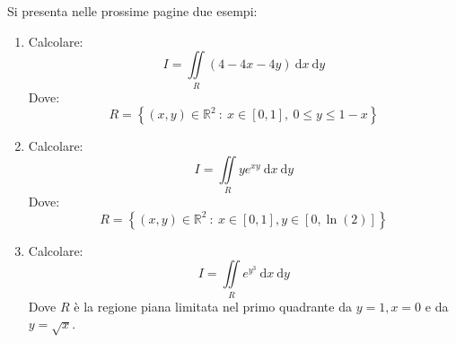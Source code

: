 \documentclass[a4paper]{article}
\begin{document}
	\noindent
	Si presenta nelle prossime pagine due esempi:
	\begin{enumerate}
		\item Calcolare:
		\begin{equation*}
			I = \iint \limits_{R} \left(4 - 4x - 4y\right) \:\mathrm{d}x \:\mathrm{d}y
		\end{equation*}
		Dove:
		\begin{equation*}
			R = \left\{\left(x,y\right) \in \mathbb{R}^{2} \: : \: x \in \left[0,1\right], \: 0 \le y \le 1-x\right\}
		\end{equation*}

		\item Calcolare:
		\begin{equation*}
			I = \iint \limits_{R} ye^{xy} \: \mathrm{d}x \: \mathrm{d}y
		\end{equation*}
		Dove:
		\begin{equation*}
			R = \left\{\left(x,y\right) \in \mathbb{R}^{2} \: : \: x \in \left[0,1\right], y\in\left[0,\ln\left(2\right)\right]\right\}
		\end{equation*}

		\item Calcolare:
		\begin{equation*}
			I = \iint \limits_{R} e^{y^{3}} \:\mathrm{d}x \:\mathrm{d}y
		\end{equation*}
		Dove $R$ è la regione piana limitata nel primo quadrante da $y = 1, x = 0$ e da $y = \sqrt{x}$.
	\end{enumerate}
	
	\newpage
\end{document}
